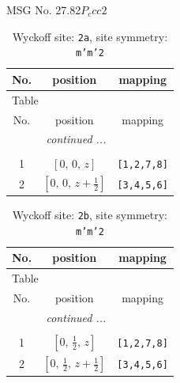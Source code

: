 \documentclass[fleqn,8pt]{jsarticle}
\begin{document}
\setcounter{MaxMatrixCols}{32}

\renewcommand{\tablename}{Table~}
\renewcommand{\figurename}{Figure~}
\begin{center}
\LARGE
MSG No. 27.82\quad$P_{c}cc2$
\end{center}
\renewcommand{\arraystretch}{1.2}
\begin{longtable}{ccc}
\caption{Wyckoff site: {\tt 2a}, site symmetry: {\tt m'm'2}}
 \\
 \hline \hline
No. & position & mapping \\ \hline \endfirsthead

\multicolumn{2}{l}{\tablename\ \thetable{}} \\
 \hline \hline
No. & position & mapping \\ \hline \endhead

 \hline \hline
\multicolumn{2}{r}{\footnotesize\it continued ...} \\ \endfoot

 \hline \hline
\multicolumn{2}{r}{} \\ \endlastfoot

1 & $\left[ 0,\, 0,\, z \right]$ & {\tt [1,2,7,8]} \\ \hline
2 & $\left[ 0,\, 0,\, z + \frac{1}{2} \right]$ & {\tt [3,4,5,6]} \\
\end{longtable}
\renewcommand{\arraystretch}{1.2}
\begin{longtable}{ccc}
\caption{Wyckoff site: {\tt 2b}, site symmetry: {\tt m'm'2}}
 \\
 \hline \hline
No. & position & mapping \\ \hline \endfirsthead

\multicolumn{2}{l}{\tablename\ \thetable{}} \\
 \hline \hline
No. & position & mapping \\ \hline \endhead

 \hline \hline
\multicolumn{2}{r}{\footnotesize\it continued ...} \\ \endfoot

 \hline \hline
\multicolumn{2}{r}{} \\ \endlastfoot

1 & $\left[ 0,\, \frac{1}{2},\, z \right]$ & {\tt [1,2,7,8]} \\ \hline
2 & $\left[ 0,\, \frac{1}{2},\, z + \frac{1}{2} \right]$ & {\tt [3,4,5,6]} \\
\end{longtable}
\renewcommand{\arraystretch}{1.2}
\end{document}
